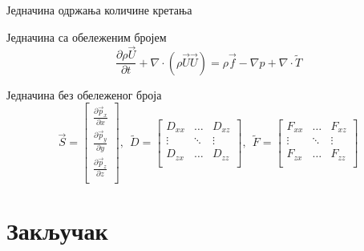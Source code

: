 \documentclass[aspectratio=169,10pt]{beamer}
\begin{document}
\begin{frame}{Једначина одржања количине кретања}

Једначина са обележеним бројем
    \begin{equation} \label{eq:1}
    \frac{\partial \rho \vec{U}}{\partial t} + \nabla \cdot (\rho \vec{U} \vec{U}) = \rho \vec{f} - \nabla p + \nabla \cdot \widetilde{T}
    \end{equation}	

Једначина без обележеног броја 
    \begin{equation*}
    \vec{S} = \begin{bmatrix}
    \frac{\partial \vec{p}_{x}}{\partial x} \\[1ex] 
    \frac{\partial \vec{p}_{y}}{\partial y} \\[1ex] 
    \frac{\partial \vec{p}_{z}}{\partial z} \\
    \end{bmatrix},\ \ \widetilde{D} = \begin{bmatrix}
    D_{xx} & \hdots & D_{xz} \\
    \vdots & \ddots & \vdots \\
    D_{zx} & \hdots & D_{zz} \\
    \end{bmatrix},\ \ \widetilde{F} = \begin{bmatrix}
    F_{xx} & \hdots & F_{xz} \\
    \vdots & \ddots & \vdots \\
    F_{zx} & \hdots & F_{zz} \\
    \end{bmatrix}
\end{equation*}
    

\end{frame}

\section{Закључак}
\end{document}

